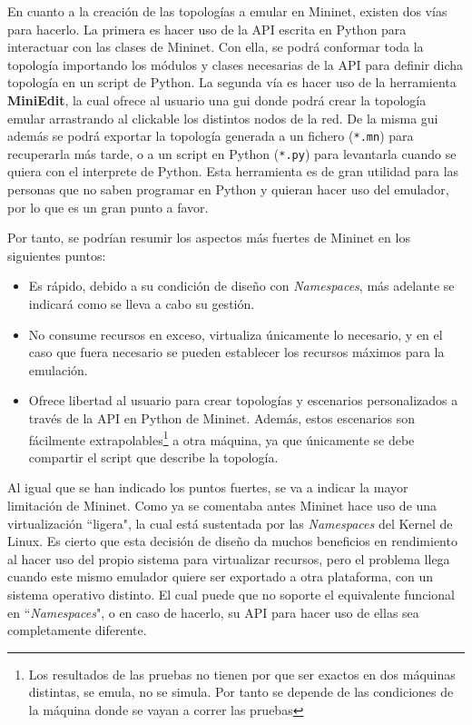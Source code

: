 En cuanto a la creación de las topologías a emular en Mininet, existen dos vías para hacerlo. La primera es hacer uso de la API escrita en Python para interactuar con las clases de Mininet. Con ella, se podrá conformar toda la topología importando los módulos y clases necesarias de la API para definir dicha topología en un script de Python. La segunda vía es hacer uso de la herramienta \textbf{MiniEdit}, la cual ofrece al usuario una \gls{gui} donde podrá crear la topología emular arrastrando al clickable los distintos nodos de la red. De la misma \gls{gui} además se podrá exportar la topología generada a un fichero (\texttt{*.mn}) para recuperarla más tarde, o a un script en Python (\texttt{*.py}) para levantarla cuando se quiera con el interprete de Python.  Esta herramienta es de gran utilidad para las personas que no saben programar en Python y quieran hacer uso del emulador, por lo que es un gran punto a favor.\\
\par

Por tanto, se podrían resumir los aspectos más fuertes de Mininet en los siguientes puntos:

\begin{itemize}
    \item Es rápido, debido a su condición de diseño con \textit{Namespaces}, más adelante se indicará como se lleva a cabo su gestión.
    \item No consume recursos en exceso, virtualiza únicamente lo necesario, y en el caso que fuera necesario se pueden establecer los recursos máximos para la emulación. 
    \item Ofrece libertad al usuario para crear topologías y escenarios personalizados a través de la API en Python de Mininet. Además, estos escenarios son fácilmente extrapolables\footnote{Los resultados de las pruebas no tienen por que ser exactos en dos máquinas distintas, se emula, no se simula. Por tanto se depende de las condiciones de la máquina donde se vayan a correr las pruebas} a otra máquina, ya que únicamente se debe compartir el script que describe la topología.
\end{itemize}

Al igual que se han indicado los puntos fuertes, se va a indicar la mayor limitación de Mininet. Como ya se comentaba antes Mininet hace uso de una virtualización ``ligera", la cual está sustentada por las \textit{Namespaces} del Kernel de Linux. Es cierto que esta decisión de diseño da muchos beneficios en rendimiento al hacer uso del propio sistema para virtualizar recursos, pero el problema llega cuando este mismo emulador quiere ser exportado a otra plataforma, con un sistema operativo distinto. El cual puede que no soporte el equivalente funcional en ``\textit{Namespaces}", o en caso de hacerlo, su API para hacer uso de ellas sea completamente diferente.


